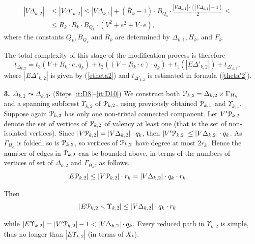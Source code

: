 \documentclass[a4paper,12pt]{article}
\newcommand{\G}{\Gamma }
\newcommand{\D}{\Delta }
\newcommand{\U}{\Upsilon }
\newcommand{\cP}{{\cal{P}}}
\numberwithin{equation}{section}
\numberwithin{figure}{section}
\begin{document}
\begin{equation}\label{vtheta2}
\begin{split}
|V\D_{k,2}| &\le |V \D'_{k,2}| \le |V\D_{k,1}|+(\overline{R}_k-1)\cdot B_{Q_k}
\cdot \frac{|V\D_{k,1}|\cdot(|V\D_{k,1}|+1)}{2}\le\\ &\le R_k \cdot
\overline{R}_k \cdot B_{Q_k}\cdot (V^2 + e^2+V\cdot e),
\end{split}
\end{equation}
where the constants $Q_k, B_{Q_k}$ and  $\overline{R}_k$ are determined  by $\D_{k,1},
H_k$, and $F_k$.


The total complexity of this stage of the modification process is
therefore
\begin{equation}\label{theta2}
t_{\D_{k,2}} = t_3(V + R_k \cdot e, q_k) + t_2((V + R_k \cdot e) \cdot
q_k)+ t_1(|E\D'_{k,2}|) + t_{\D'_{k,2}},
\end{equation}
where $|E\D'_{k,2}|$ is given by (\ref{etheta2}) and $t_{\D'_{k,2}}$ is
estimated in formula (\ref{theta'2}).


{\bf 3. $\D_{k,2} \leadsto \D_{k,3}$.} (Steps \ref{it:D8}--\ref{it:D10}) We construct both $\cP_{k,2}=\D_{k,2}\times \G_{H_k}$ and a spanning
subforest $\U_{k,2}$ of $\cP_{k,2}$, using previously obtained $\cP_{k,1}$ and $\U_{k,1}$. Suppose again
$\cP_{k,2}$ has only one non-trivial connected component.
 Let $V'\cP_{k,2}$ denote the set of vertices of $\cP_{k,2}$ of valency at least one
(that is the set of non-isolated vertices). Since $|V\cP_{k,2}|=|V\D_{k,2}|\cdot q_k$, then $|V'\cP_{k,2}|
\le |V\D_{k,2}|\cdot q_k$. As $\G_{H_k}$ is folded, so is $\cP_{k,2}$, so
vertices of $\cP_{k,2}$ have degree at most $2r_k$. Hence the number of
edges in $\cP_{k,2}$ can be bounded above, in terms of the numbers of
vertices of set of $\D_{k,2}$ and $\G_{H_k}$, as follows.
\[ |E\cP_{k,2}| \le |V\cP_{k,2}|\cdot r_k =|V\D_{k,2}|\cdot q_k \cdot r_k.\]

Then
\[|E\cP_{k,2}\smallsetminus \U_{k,2}| \le |V\D_{k,2}|\cdot q_k \cdot r_k\]

while $|E \U_{k,2}| = |V'\cP_{k,2}| - 1 < |V\D_{k,2}|\cdot q_k.$ Every reduced
path in $\U_{k,2}$ is simple, thus no longer than $|E\U_{k,2}|$ (in terms
of $X_k$).
\end{document}
